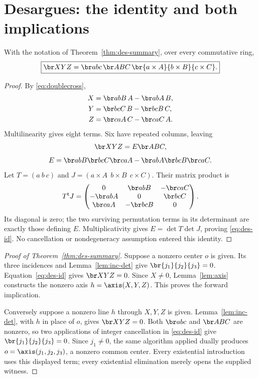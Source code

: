 \section{Desargues: the identity and both implications}\label{sec:des}

\begin{lemma}\label{lem:des-id}
With the notation of Theorem~\ref{thm:des-summary}, over every
commutative ring,
\begin{equation}\label{eq:des-id}
 \boxed{\br X Y Z=\br a b c\,\br A B C\,
              \br{a\times A}{b\times B}{c\times C}.}
\end{equation}
\end{lemma}
\begin{proof}
By \eqref{eq:doublecross},
\begin{align*}
 X&=\br a b B\,A-\br a b A\,B,\\
 Y&=\br b c C\,B-\br b c B\,C,\\
 Z&=\br c a A\,C-\br c a C\,A.
\end{align*}
Multilinearity gives eight terms. Six have repeated columns, leaving
\[
 \br X Y Z=E\br A B C,
\]
\[
 E=\br a b B\br b c C\br c a A
       -\br a b A\br b c B\br c a C.
\]
Let $T=(a\ b\ c)$ and $J=(a\times A\ \ b\times B\ \ c\times C)$.
Their matrix product is
\[
 T^{\mathsf t}J=
 \begin{pmatrix}
 0&\br a b B&-\br c a C\\
 -\br a b A&0&\br b c C\\
 \br c a A&-\br b c B&0
 \end{pmatrix}.
\]
Its diagonal is zero; the two surviving permutation terms in its
determinant are exactly those defining $E$. Multiplicativity gives
$E=\det T\det J$, proving \eqref{eq:des-id}. No cancellation or
nondegeneracy assumption entered this identity.
\end{proof}

\begin{proof}[Proof of Theorem~\ref{thm:des-summary}]
Suppose a nonzero center $o$ is given. Its three incidences and
Lemma~\ref{lem:inc-det} give $\br{j_1}{j_2}{j_3}=0$.
Equation~\eqref{eq:des-id} gives $\br X Y Z=0$.
Since $X\ne0$, Lemma~\ref{lem:axis} constructs the nonzero
axis $h=\axis(X,Y,Z)$. This proves the forward implication.

Conversely suppose a nonzero line $h$ through $X,Y,Z$ is given.
Lemma~\ref{lem:inc-det}, with $h$ in place of $o$, gives
$\br X Y Z=0$. Both $\br a b c$ and $\br A B C$ are nonzero,
so two applications of integer cancellation in \eqref{eq:des-id}
give $\br{j_1}{j_2}{j_3}=0$. Since $j_1\ne0$, the same algorithm
applied dually produces $o=\axis(j_1,j_2,j_3)$, a nonzero common center.
Every existential introduction uses this displayed term; every
existential elimination merely opens the supplied witness.
\end{proof}

